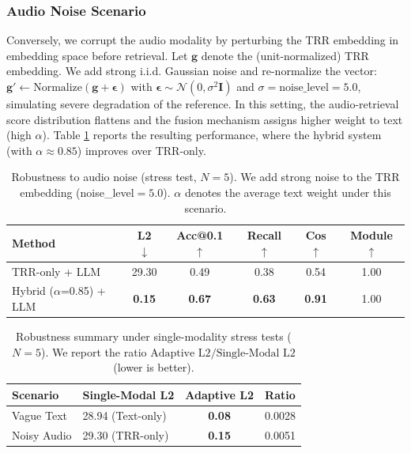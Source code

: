\documentclass{article}
\begin{document}
\subsubsection{Audio Noise Scenario}
Conversely, we corrupt the audio modality by perturbing the TRR embedding in embedding space before retrieval. Let $\mathbf{g}$ denote the (unit-normalized) TRR embedding. We add strong i.i.d. Gaussian noise and re-normalize the vector: $\mathbf{g}' \leftarrow \text{Normalize}(\mathbf{g} + \boldsymbol{\epsilon})$ with $\boldsymbol{\epsilon} \sim \mathcal{N}(0, \sigma^2 \mathbf{I})$ and $\sigma=\text{noise\_level}=5.0$, simulating severe degradation of the reference. In this setting, the audio-retrieval score distribution flattens and the fusion mechanism assigns higher weight to text (high $\alpha$). Table \ref{tab:robustness_noise} reports the resulting performance, where the hybrid system (with $\alpha \approx 0.85$) improves over TRR-only.

\begin{table}[h]
	\centering
	\caption{Robustness to audio noise (stress test, $N=5$). We add strong noise to the TRR embedding (noise\_level$=5.0$). $\alpha$ denotes the average text weight under this scenario.}
	\label{tab:robustness_noise}
	\begin{tabular}{lccccc}
		\toprule
		\textbf{Method}                  & \textbf{L2} $\downarrow$ & \textbf{Acc@0.1} $\uparrow$ & \textbf{Recall} $\uparrow$ & \textbf{Cos} $\uparrow$ & \textbf{Module} $\uparrow$ \\
		\midrule
		TRR-only + LLM                   & 29.30               & 0.49             & 0.38          & 0.54          & 1.00            \\
		Hybrid ($\alpha$=0.85) + LLM     & \textbf{0.15}        & \textbf{0.67}     & \textbf{0.63}   & \textbf{0.91}   & 1.00            \\
		\bottomrule
	\end{tabular}
\end{table}

\begin{table}[h]
	\centering
	\caption{Robustness summary under single-modality stress tests ($N=5$). We report the ratio $\text{Adaptive L2}/\text{Single-Modal L2}$ (lower is better).}
	\label{tab:robustness_summary}
	\begin{tabular}{@{}llcc@{}}
		\toprule
		\textbf{Scenario}       & \textbf{Single-Modal L2} & \textbf{Adaptive L2} & \textbf{Ratio} \\
		\midrule
		Vague Text              & 28.94 (Text-only)       & \textbf{0.08}       & 0.0028           \\
		Noisy Audio             & 29.30 (TRR-only)         & \textbf{0.15}       & 0.0051           \\
		\bottomrule
	\end{tabular}
\end{table}
\end{document}
